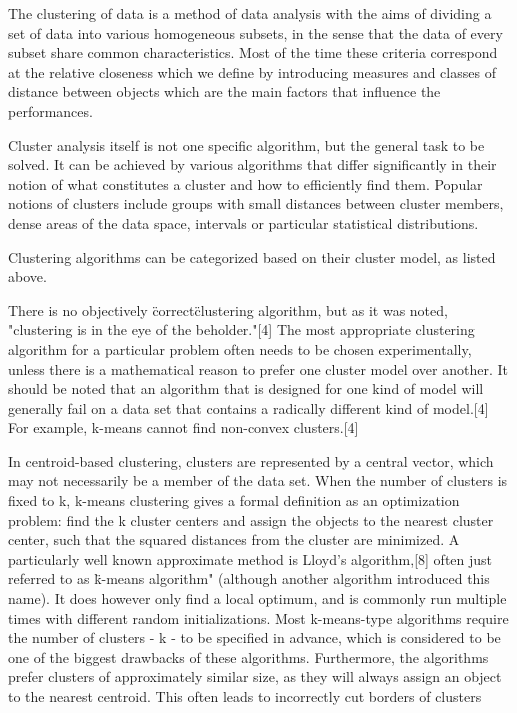 

The clustering of data is a method of data analysis with the aims of dividing a set of data into various 
homogeneous subsets, in the sense that the data of every subset share common characteristics.
Most of the time these criteria correspond at the relative closeness which we define by introducing 
measures and classes of distance between objects which are the main factors that influence the performances. 



Cluster analysis itself is not one specific algorithm, but the general task to be solved. It can be 
achieved by various algorithms that differ significantly in their notion of what constitutes a cluster 
and how to efficiently find them. Popular notions of clusters include groups with small distances 
between cluster members, dense areas of the data space, intervals or particular statistical 
distributions.

%
Clustering algorithms can be categorized based on their cluster model, as listed above. 

There is no objectively \"correct\" clustering algorithm, but as it was noted, "clustering is in the
eye of the beholder."[4] The most appropriate clustering algorithm for a particular problem often 
needs to be chosen experimentally, unless there is a mathematical reason to prefer one cluster model 
over another. It should be noted that an algorithm that is designed for one kind of model will 
generally fail on a data set that contains a radically different kind of model.[4] For example, 
k-means cannot find non-convex clusters.[4]

%
In centroid-based clustering, clusters are represented by a central vector, which may not necessarily
 be a member of the data set. When the number of clusters is fixed to k, k-means clustering gives a 
 formal definition as an optimization problem: find the k cluster centers and assign the objects to the
  nearest cluster center, such that the squared distances from the cluster are minimized.
%
A particularly well known approximate method is Lloyd's algorithm,[8] often just referred to as 
\"k-means algorithm" (although another algorithm introduced this name). It does however only find a 
local optimum, and is commonly run multiple times with different random initializations.
%
Most k-means-type algorithms require the number of clusters - k - to be specified in advance, which is considered to be one of the biggest drawbacks of these algorithms. Furthermore, the algorithms prefer clusters of approximately similar size, as they will always assign an object to the nearest centroid. This often leads to incorrectly cut borders of clusters